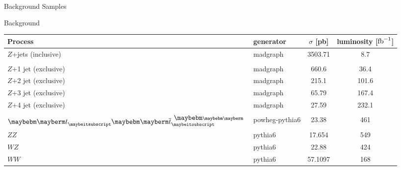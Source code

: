\begin{frame}{Background Samples}

\begin{center}
Background\\
\footnotesize
\begin{tabular}{|l|l|c|c|}
\hline
Process & generator & $\sigma$ [pb]& luminosity [$\mbox{$\textrm{fb}^{-1}$}$] \\
\hline 
$Z$+jets (inclusive)       & madgraph & 3503.71 & 8.7 \\
 & & & \\
$Z$+1 jet (exclusive)      & madgraph & 660.6 & 36.4\\
$Z$+2 jet (exclusive)     & madgraph & 215.1 & 101.6 \\
$Z$+3 jet (exclusive)     & madgraph & 65.79 & 167.4 \\
$Z$+4 jet (exclusive)     & madgraph & 27.59 & 232.1 \\
 & & & \\
$\Pqt \Paqt$ & powheg-pythia6 & 23.38 & 461 \\
$ZZ$ & pythia6 & 17.654 & 549 \\
$WZ$ & pythia6 & 22.88 & 424 \\
$WW$ & pythia6 & 57.1097 & 168 \\
\hline
\end{tabular}
\end{center}

\end{frame}




